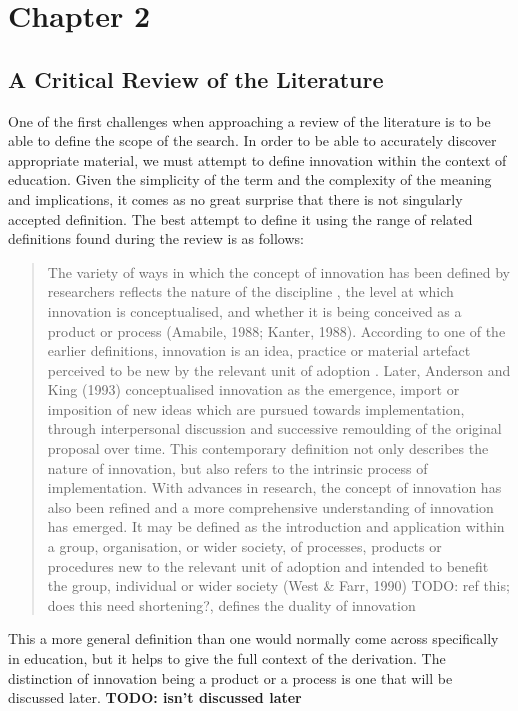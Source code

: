 \section{Chapter 2}
\subsection{A Critical Review of the Literature}
One of the first challenges when approaching a review of the literature is to be able to define the scope of the search. In order to be able to accurately discover appropriate material, we must attempt to define innovation within the context of education. Given the simplicity of the term and the complexity of the meaning and implications, it comes as no great surprise that there is not singularly accepted definition. The best attempt to define it using the range of related definitions found during the review is as follows:

\begin{quote}
The variety of ways in which the concept of innovation has been defined by researchers reflects the nature of the discipline \cite{Gopalakrishnan_1994}, the level at which innovation is conceptualised, and whether it is being conceived as a product or process (Amabile, 1988; Kanter, 1988). According to one of the earlier definitions, innovation is an idea, practice or material artefact perceived to be new by the relevant unit of adoption \cite{Allen_1975}. Later, Anderson and King (1993) conceptualised innovation as the emergence, import or imposition of new ideas which are pursued towards implementation, through interpersonal discussion and successive remoulding of the original proposal over time. This contemporary definition not only describes the nature of innovation, but also refers to the intrinsic process of implementation. With advances in research, the concept of innovation has also been refined and a more comprehensive understanding of innovation has emerged. It may be defined as the introduction and application within a group, organisation, or wider society, of processes, products or procedures new to the relevant unit of adoption and intended to benefit the group, individual or wider society (West \& Farr, 1990) TODO: ref this; does this need shortening?, defines the duality of innovation
\end{quote}  \cite{Sharma_2005}

This a more general definition than one would normally come across specifically in education, but it helps to give the full context of the derivation. The distinction of innovation being a product or a process is one that will be discussed later. \textbf{TODO: isn't discussed later}

